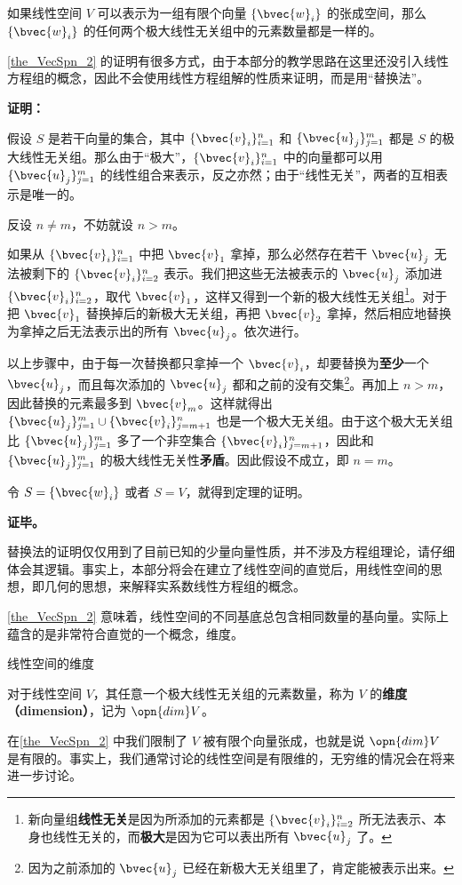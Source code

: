 \begin{theorem}{}\label{the_VecSpn_2}
如果线性空间 $V$ 可以表示为一组有限个向量 $\{\bvec{w}_i\}$ 的张成空间，那么 $\{\bvec{w}_i\}$ 的任何两个极大线性无关组中的元素数量都是一样的。
\end{theorem}

\autoref{the_VecSpn_2} 的证明有很多方式，由于本部分的教学思路在这里还没引入线性方程组的概念，因此不会使用线性方程组解的性质来证明，而是用“替换法”。

\textbf{证明：}

假设 $S$ 是若干向量的集合，其中 $\{\bvec{v}_i\}_{i=1}^n$ 和 $\{\bvec{u}_j\}^m_{j=1}$ 都是 $S$ 的极大线性无关组。那么由于“极大”，$\{\bvec{v}_i\}_{i=1}^n$ 中的向量都可以用 $\{\bvec{u}_j\}^m_{j=1}$ 的线性组合来表示，反之亦然；由于“线性无关”，两者的互相表示是唯一的。

反设 $n\not=m$，不妨就设 $n>m$。

如果从 $\{\bvec{v}_i\}_{i=1}^n$ 中把 $\bvec{v}_1$ 拿掉，那么必然存在若干 $\bvec{u}_j$ 无法被剩下的 $\{\bvec{v}_i\}_{i=2}^n$ 表示。我们把这些无法被表示的 $\bvec{u}_j$ 添加进 $\{\bvec{v}_i\}_{i=2}^n$，取代 $\bvec{v}_1$，这样又得到一个新的极大线性无关组\footnote{新向量组\textbf{线性无关}是因为所添加的元素都是 $\{\bvec{v}_i\}_{i=2}^n$ 所无法表示、本身也线性无关的，而\textbf{极大}是因为它可以表出所有 $\bvec{u}_j$ 了。}。对于把 $\bvec{v}_1$ 替换掉后的新极大无关组，再把 $\bvec{v}_2$ 拿掉，然后相应地替换为拿掉之后无法表示出的所有 $\bvec{u}_j$。依次进行。

以上步骤中，由于每一次替换都只拿掉一个 $\bvec{v}_i$，却要替换为\textbf{至少}一个 $\bvec{u}_j$，而且每次添加的 $\bvec{u}_j$ 都和之前的没有交集\footnote{因为之前添加的 $\bvec{u}_j$ 已经在新极大无关组里了，肯定能被表示出来。}。再加上 $n>m$，因此替换的元素最多到 $\bvec{v}_m$。这样就得出 $\{\bvec{u}_j\}^m_{j=1}\cup\{\bvec{v}_i\}^n_{j=m+1}$ 也是一个极大无关组。由于这个极大无关组比 $\{\bvec{u}_j\}^m_{j=1}$ 多了一个非空集合 $\{\bvec{v}_i\}^n_{j=m+1}$，因此和 $\{\bvec{u}_j\}^m_{j=1}$ 的极大线性无关性\textbf{矛盾}。因此假设不成立，即 $n=m$。

令 $S=\{\bvec{w}_i\}$ 或者 $S=V$，就得到定理的证明。

\textbf{证毕。}

替换法的证明仅仅用到了目前已知的少量向量性质，并不涉及方程组理论，请仔细体会其逻辑。事实上，本部分将会在建立了线性空间的直觉后，用线性空间的思想，即几何的思想，来解释实系数线性方程组的概念。

\autoref{the_VecSpn_2} 意味着，线性空间的不同基底总包含相同数量的基向量。实际上蕴含的是非常符合直觉的一个概念，维度。

\begin{definition}{线性空间的维度}

对于线性空间 $V$，其任意一个极大线性无关组的元素数量，称为 $V$ 的\textbf{维度（dimension）}，记为 $\opn{dim}V$。

\end{definition}

在\autoref{the_VecSpn_2} 中我们限制了 $V$ 被有限个向量张成，也就是说 $\opn{dim}V$ 是有限的。事实上，我们通常讨论的线性空间是有限维的，无穷维的情况会在将来进一步讨论。



